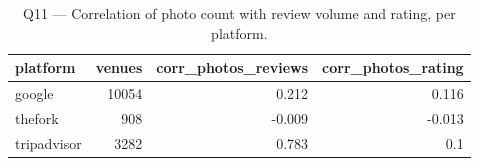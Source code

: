 \begin{table}[ht]
\centering
\caption{Q11 — Correlation of photo count with review volume and rating, per platform.}
\label{tab:q11_photo_correlations}
{\tiny
\begin{tabular}{lrrr}
\toprule
platform & venues & corr\_photos\_reviews & corr\_photos\_rating \\
\midrule
google & 10054 & 0.212 & 0.116 \\
thefork & 908 & -0.009 & -0.013 \\
tripadvisor & 3282 & 0.783 & 0.1 \\
\bottomrule
\end{tabular}
}
\end{table}
